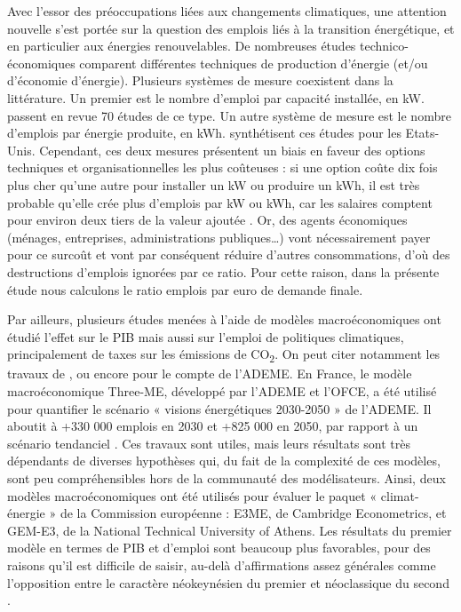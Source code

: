 Avec l’essor des préoccupations liées aux changements climatiques, une attention nouvelle s’est portée sur la question des emplois liés à la transition énergétique, et en particulier aux énergies renouvelables. De nombreuses études technico-économiques comparent différentes techniques de production d’énergie (et/ou d’économie d’énergie). Plusieurs systèmes de mesure coexistent dans la littérature. Un premier est le nombre d’emploi par capacité installée, en kW. \citet{Cameron2015} passent en revue 70 études de ce type. Un autre système de mesure est le nombre d’emplois par énergie produite, en kWh. \citet{Wei2010} synthétisent ces études pour les Etats-Unis. Cependant, ces deux mesures présentent un biais en faveur des options techniques et organisationnelles les plus coûteuses : si une option coûte dix fois plus cher qu'une autre pour installer un kW ou produire un kWh, il est très probable qu'elle crée plus d'emplois par kW ou kWh, car les salaires comptent pour environ deux tiers de la valeur ajoutée \citep{Cotis2009}. Or, des agents économiques (ménages, entreprises, administrations publiques…) vont nécessairement payer pour ce surcoût et vont par conséquent réduire d'autres consommations, d’où des destructions d’emplois ignorées par ce ratio. Pour cette raison, dans la présente étude nous calculons le ratio emplois par euro de demande finale.

Par ailleurs, plusieurs études menées à l’aide de modèles macroéconomiques ont étudié l’effet sur le PIB mais aussi sur l’emploi de politiques climatiques, principalement de taxes sur les émissions de CO\textsubscript{2}. On peut citer notamment les travaux de \citet{Lehr2008}, \citet{Lehr2012} ou encore \citet{EY2015} pour le compte de l’ADEME. En France, le modèle macroéconomique Three-ME, développé par l’ADEME et l’OFCE, a été utilisé pour quantifier le scénario « visions énergétiques 2030-2050 » de l’ADEME. Il aboutit à +330 000 emplois en 2030 et +825 000 en 2050, par rapport à un scénario tendanciel \citep{ADEME2013}. Ces travaux sont utiles, mais leurs résultats sont très dépendants de diverses hypothèses qui, du fait de la complexité de ces modèles, sont peu compréhensibles hors de la communauté des modélisateurs. Ainsi, deux modèles macroéconomiques ont été utilisés pour évaluer le paquet « climat-énergie » de la Commission européenne : E3ME, de Cambridge Econometrics, et GEM-E3, de la National Technical University of Athens. Les résultats du premier modèle en termes de PIB et d’emploi sont beaucoup plus favorables, pour des raisons qu’il est difficile de saisir, au-delà d’affirmations assez générales comme l’opposition entre le caractère néokeynésien du premier et néoclassique du second \citep{Bruyn2014}.

